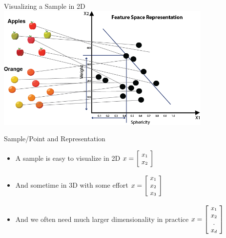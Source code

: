 \documentclass[aspectratio=169, 14pt,usenames,dvipsnames]{beamer}
\begin{document}
\begin{frame}{Visualizing a Sample in 2D}
\centering
\includegraphics[width=0.8\textwidth,height=0.7\textheight]{Images/deeper_look_16.png}
\end{frame}


\begin{frame}{Sample/Point and Representation}
\begin{itemize}
\item A sample is easy to visualize in 2D
      $\small x =  \left[\!
      \begin{array}{c}
      x_1 \\
      x_2
      \end{array}
      \!\right]$ \\
 \item And sometime in 3D with some effort  $ \small x =  \left[\!
      \begin{array}{c}
       x_1 \\
       x_2 \\
       x_3
      \end{array}
      \!\right]$ \\
\item And we often need much larger dimensionality in practice
    $ \small x =  \left[\!
    \begin{array}{c}
      x_1 \\
      x_2 \\
       . \\
      x_d
    \end{array}
  \!\right]$
\end{itemize}
\end{frame}
\end{document}
